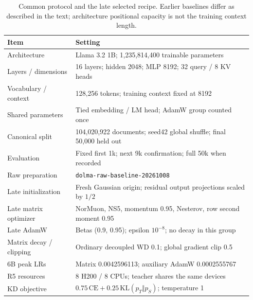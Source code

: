 \begin{table}[tbp]
\centering
\small
\caption{Common protocol and the late selected recipe. Earlier baselines differ as described in the text; architecture positional capacity is not the training context length.}
\label{tab:setup}
\begin{tabular}{p{.23\linewidth}p{.69\linewidth}}
\toprule
Item & Setting \\
\midrule
Architecture & Llama 3.2 1B; 1,235,814,400 trainable parameters \\
Layers / dimensions & 16 layers; hidden 2048; MLP 8192; 32 query / 8 KV heads \\
Vocabulary / context & 128,256 tokens; training context fixed at 8192 \\
Shared parameters & Tied embedding / LM head; AdamW group counted once \\
Canonical split & 104,020,922 documents; seed42 global shuffle; final 50,000 held out \\
Evaluation & Fixed first 1k; next 9k confirmation; full 50k when recorded \\
Raw preparation & \texttt{dolma-raw-baseline-20261008} \\
Late initialization & Fresh Gaussian origin; residual output projections scaled by $1/2$ \\
Late matrix optimizer & NorMuon, NS5, momentum 0.95, Nesterov, row second moment 0.95 \\
Late AdamW & Betas (0.9, 0.95); epsilon $10^{-8}$; no decay in this group \\
Matrix decay / clipping & Ordinary decoupled WD 0.1; global gradient clip 0.5 \\
6B peak LRs & Matrix 0.0042596113; auxiliary AdamW 0.0002555767 \\
R5 resources & 8 H200 / 8 CPUs; teacher shares the same devices \\
KD objective & $0.75\,\mathrm{CE}+0.25\,\mathrm{KL}(p_T\Vert p_S)$; temperature 1 \\
\bottomrule
\end{tabular}
\end{table}
